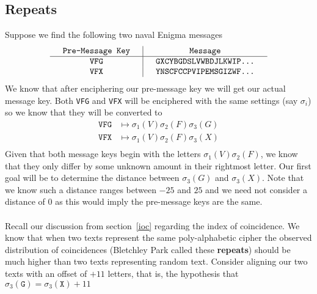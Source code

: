   \subsection{Repeats}
  Suppose we find the following two naval Enigma messages
  \[
    \setlength{\arraycolsep}{15pt}
    \begin{array}{c | c}
      \texttt{Pre-Message Key} & \texttt{Message}                \\
      \hline
      \texttt{VFG}             & \texttt{GXCYBGDSLVWBDJLKWIP...} \\
      \texttt{VFX}             & \texttt{YNSCFCCPVIPEMSGIZWF...} \\
    \end{array}
  \]
  We know that after enciphering our pre-message key we will get our
  actual message key. Both \texttt{VFG} and \texttt{VFX} will be
  enciphered with the same settings (say $\sigma_i$) so we know that
  they will be converted to
  \begin{align*}
    \texttt{VFG} & \mapsto \sigma_1(V)\sigma_2(F)\sigma_3(G) \\
    \texttt{VFX} & \mapsto \sigma_1(V)\sigma_2(F)\sigma_3(X) \\
  \end{align*}
  Given that both message keys begin with the letters
  $\sigma_1(V)\sigma_2(F)$, we know that they only differ by some
  unknown amount in their rightmost letter. Our first goal will be to
  determine the distance between $\sigma_3(G)$ and $\sigma_3(X)$.
  Note that we know such a distance ranges between $-25$ and $25$ and
  we need not consider a distance of $0$ as this would imply the
  pre-message keys are the same.
  \\\\Recall our discussion from section~\ref{ioc} regarding the
  index of coincidence. We know that when two texts represent the
  same poly-alphabetic cipher the observed distribution of coincidences
  (Bletchley Park called these {\bf{repeats}}) should be much higher
  than two texts representing random text. Consider aligning our two
  texts with an offset of $+11$ letters, that is, the hypothesis that
  $\sigma_3(\texttt{G}) = \sigma_3(\texttt{X}) + 11$
  \begin{center}
  \end{center}
